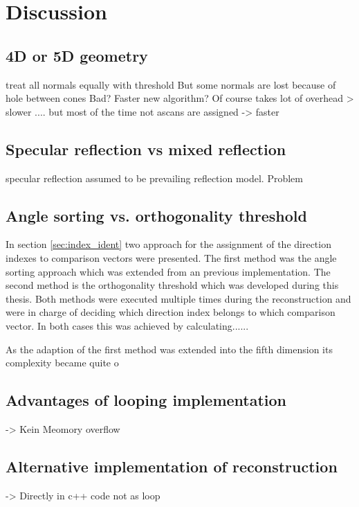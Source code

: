 \chapter{Discussion}
\label{chap:discussion}


\section{4D or 5D geometry}

treat all normals equally with threshold
But some normals are lost because of hole between cones
Bad?
Faster new algorithm? Of course takes lot of overhead > slower .... but most of the time not ascans are assigned -> faster

\section{Specular reflection vs mixed reflection}

\cite{PatrickHucker2014EvaluationRuckstreumodells} specular reflection assumed to be prevailing reflection model. Problem


\section{Angle sorting vs. orthogonality threshold}
In section \ref{sec:index_ident} two approach for the assignment of the direction indexes to comparison vectors were presented. The first method was the angle sorting approach which was extended from an previous implementation. The second method is the orthogonality threshold which was developed during this thesis. Both methods were executed multiple times during the reconstruction and were in charge of deciding which direction index belongs to which comparison vector. In both cases this was achieved by calculating......



As the adaption of the first method was extended into the fifth dimension its complexity became quite o


\section{Advantages of looping implementation}

-> Kein Meomory overflow

\section{Alternative implementation of reconstruction}

-> Directly in c++ code not as loop